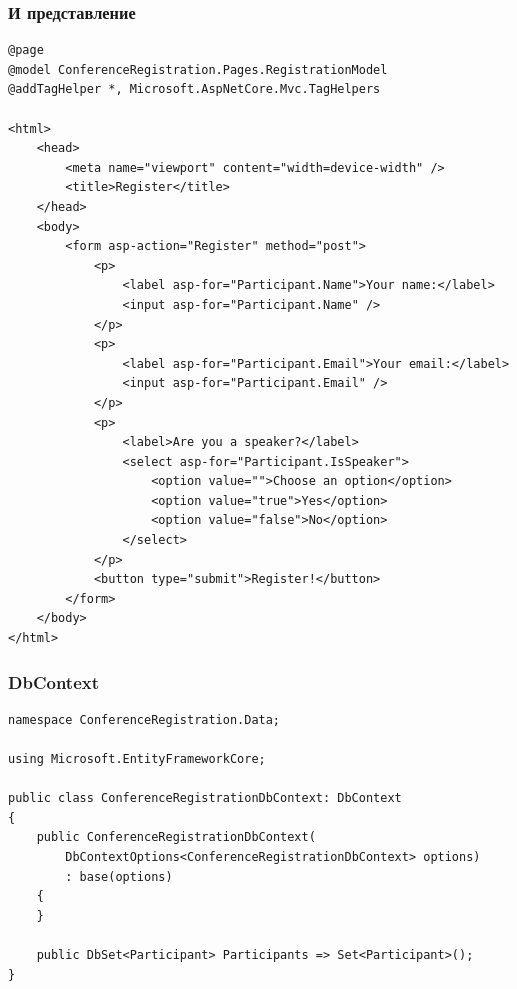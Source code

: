 \documentclass{../../slides-style}
\begin{document}
    \begin{frame}[fragile]
        \frametitle{И представление}
        \begin{ssmall}
            \begin{verbatim}
@page
@model ConferenceRegistration.Pages.RegistrationModel
@addTagHelper *, Microsoft.AspNetCore.Mvc.TagHelpers

<html>
    <head>
        <meta name="viewport" content="width=device-width" />
        <title>Register</title>
    </head>
    <body>
        <form asp-action="Register" method="post">
            <p>
                <label asp-for="Participant.Name">Your name:</label>
                <input asp-for="Participant.Name" />
            </p>
            <p>
                <label asp-for="Participant.Email">Your email:</label>
                <input asp-for="Participant.Email" />
            </p>
            <p>
                <label>Are you a speaker?</label>
                <select asp-for="Participant.IsSpeaker">
                    <option value="">Choose an option</option>
                    <option value="true">Yes</option>
                    <option value="false">No</option>
                </select>
            </p>
            <button type="submit">Register!</button>
        </form>
    </body>
</html>
            \end{verbatim}
        \end{ssmall}
    \end{frame}

    \begin{frame}[fragile]
        \frametitle{DbContext}
        \begin{footnotesize}
            \begin{verbatim}
namespace ConferenceRegistration.Data;

using Microsoft.EntityFrameworkCore;

public class ConferenceRegistrationDbContext: DbContext
{
    public ConferenceRegistrationDbContext(
        DbContextOptions<ConferenceRegistrationDbContext> options)
        : base(options)
    {
    }

    public DbSet<Participant> Participants => Set<Participant>();
}
            \end{verbatim}
        \end{footnotesize}
    \end{frame}
\end{document}
